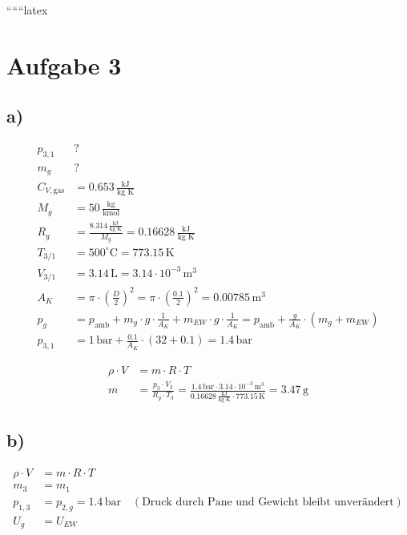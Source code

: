 
``````latex


\section*{Aufgabe 3}

\subsection*{a)}

\begin{align*}
    p_{3,1} & ? \\
    m_{g} & ? \\
    C_{V,\text{gas}} & = 0.653 \, \frac{\text{kJ}}{\text{kg K}} \\
    M_{g} & = 50 \, \frac{\text{kg}}{\text{kmol}} \\
    R_{g} & = \frac{8.314 \, \frac{\text{kJ}}{\text{kg K}}}{M_{g}} = 0.16628 \, \frac{\text{kJ}}{\text{kg K}} \\
    T_{3/1} & = 500^\circ \text{C} = 773.15 \, \text{K} \\
    V_{3/1} & = 3.14 \, \text{L} = 3.14 \cdot 10^{-3} \, \text{m}^3 \\
    A_{K} & = \pi \cdot \left( \frac{D}{2} \right)^2 = \pi \cdot \left( \frac{0.1}{2} \right)^2 = 0.00785 \, \text{m}^3 \\
    p_{g} & = p_{\text{amb}} + m_{g} \cdot g \cdot \frac{1}{A_{K}} + m_{EW} \cdot g \cdot \frac{1}{A_{K}} = p_{\text{amb}} + \frac{g}{A_{K}} \cdot (m_{g} + m_{EW}) \\
    p_{3,1} & = 1 \, \text{bar} + \frac{0.1}{A_{K}} \cdot (32 + 0.1) = 1.4 \, \text{bar}
\end{align*}

\begin{align*}
    \rho \cdot V & = m \cdot R \cdot T \\
    m & = \frac{p_{3} \cdot V_{3}}{R_{g} \cdot T_{3}} = \frac{1.4 \, \text{bar} \cdot 3.14 \cdot 10^{-3} \, \text{m}^3}{0.16628 \, \frac{\text{kJ}}{\text{kg K}} \cdot 773.15 \, \text{K}} = 3.47 \, \text{g}
\end{align*}

\subsection*{b)}

\begin{align*}
    \rho \cdot V & = m \cdot R \cdot T \\
    m_{3} & = m_{1} \\
    p_{1,3} & = p_{2,g} = 1.4 \, \text{bar} \quad (\text{Druck durch Pane und Gewicht bleibt unverändert}) \\
    U_{g} & = U_{EW}
\end{align*}

